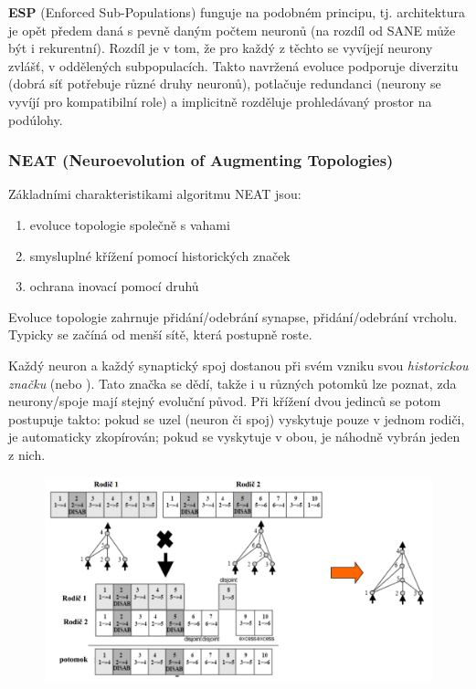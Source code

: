 \textbf{ESP} (Enforced Sub-Populations) funguje na podobném principu, tj. architektura je opět předem daná s pevně daným počtem neuronů (na rozdíl od SANE může být i rekurentní). Rozdíl je v tom, že pro každý z těchto  se vyvíjejí neurony zvlášť, v oddělených subpopulacích. Takto navržená evoluce podporuje diverzitu (dobrá síť potřebuje různé druhy neuronů), potlačuje redundanci (neurony se vyvíjí pro kompatibilní role) a implicitně rozděluje prohledávaný prostor na podúlohy.


\subsubsection{NEAT (Neuroevolution of Augmenting Topologies)}
Základními charakteristikami algoritmu NEAT jsou: 
\begin{enumerate}
	
	
	\item evoluce topologie společně s vahami
	\item smysluplné křížení pomocí historických značek
	\item ochrana inovací pomocí druhů
\end{enumerate}
Evoluce topologie zahrnuje přidání/odebrání synapse, přidání/odebrání vrcholu. Typicky se začíná od menší sítě, která postupně roste.

Každý neuron a každý synaptický spoj dostanou při svém vzniku svou \textit{historickou značku} (nebo ). Tato značka se dědí, takže i u různých potomků lze poznat, zda neurony/spoje mají stejný evoluční původ. Při křížení dvou jedinců se potom postupuje takto: pokud se uzel (neuron či spoj) vyskytuje pouze v jednom rodiči, je automaticky zkopírován; pokud se vyskytuje v obou, je náhodně vybrán jeden z nich.
\begin{figure}[H]
	\includegraphics[width=\textwidth]{img/neat.png}
\end{figure}

